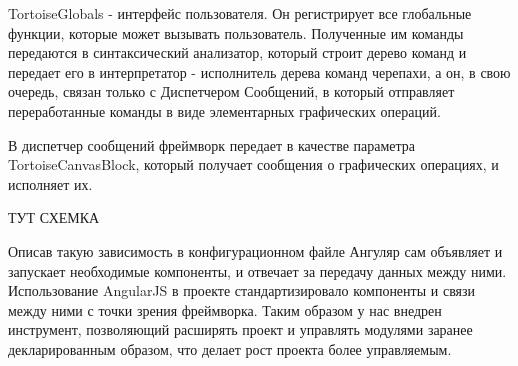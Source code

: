 TortoiseGlobals - интерфейс пользователя. Он регистрирует все глобальные функции, которые может вызывать пользователь. Полученные им команды передаются в синтаксический анализатор, который строит дерево команд и передает его в интерпретатор - исполнитель дерева команд черепахи, а он, в свою очередь,  связан только с Диспетчером Сообщений, в который отправляет переработанные команды в виде элементарных графических операций.

В диспетчер сообщений фреймворк передает в качестве параметра TortoiseCanvasBlock, который получает сообщения о графических операциях, и исполняет их.

\vspace{6mm}
ТУТ СХЕМКА
\vspace{6mm}

Описав такую зависимость в конфигурационном файле Ангуляр сам объявляет и запускает необходимые компоненты, и отвечает за передачу данных между ними. Использование AngularJS в проекте стандартизировало компоненты и связи между ними с точки зрения фреймворка. Таким образом у нас внедрен инструмент, позволяющий расширять проект и управлять модулями заранее декларированным образом, что делает рост проекта более управляемым.


\clearpage